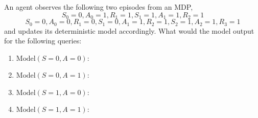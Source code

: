 An agent observes the following two episodes from an MDP,
\[
S_0 = 0, A_0 = 1, R_1 = 1, S_1 = 1, A_1= 1, R_2 = 1
\]
\[
S_0 = 0, A_0 = 0, R_1 = 0, S_1 = 0, A_1= 1, R_2 = 1, S_2 = 1, A_2=1, R_{3} = 1
\]
and updates its deterministic model accordingly. What would the model output for the following queries:

\begin{enumerate}
  \item $\text{Model}(S = 0, A = 0)$:
  \item $\text{Model}(S = 0, A = 1)$:
  \item $\text{Model}(S = 1, A = 0)$:
  \item $\text{Model}(S = 1, A = 1)$:
\end{enumerate}